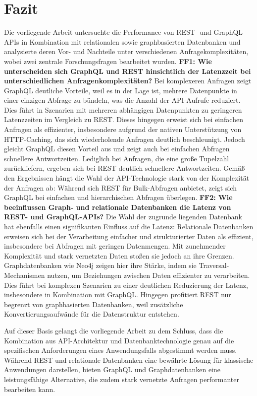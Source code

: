 \chapter{Fazit} %
\label{sec:fazit}
Die vorliegende Arbeit untersuchte die Performance von REST- und GraphQL-APIs in Kombination mit relationalen sowie graphbasierten Datenbanken und analysierte deren Vor- und Nachteile unter verschiedenen Anfragekomplexitäten, wobei zwei zentrale Forschungsfragen bearbeitet wurden.
\newline
\noindent
\textbf{FF1: Wie unterscheiden sich GraphQL und REST hinsichtlich der Latenzzeit bei unterschiedlichen Anfragenkomplexitäten?}
Bei komplexeren Anfragen zeigt GraphQL deutliche Vorteile, weil es in der Lage ist, mehrere Datenpunkte in einer einzigen Abfrage zu bündeln, was die Anzahl der API-Aufrufe reduziert. Dies führt in Szenarien mit mehreren abhängigen Datenpunkten zu geringeren Latenzzeiten im Vergleich zu REST. Dieses hingegen erweist sich bei einfachen Anfragen als effizienter, insbesondere aufgrund der nativen Unterstützung von HTTP-Caching, das sich wiederholende Anfragen deutlich beschleunigt. Jedoch gleicht GraphQL diesen Vorteil aus und zeigt auch bei einfachen Abfragen schnellere Antwortzeiten. Lediglich bei Anfragen, die eine große Tupelzahl zurückliefern, ergeben sich bei REST deutlich schnellere Antwortzeiten. Gemäß den Ergebnissen hängt die Wahl der API-Technologie stark von der Komplexität der Anfragen ab: Während sich REST für Bulk-Abfragen anbietet, zeigt sich GraphQL bei einfachen und hierarchischen Abfragen überlegen. 
\newline
\noindent
\textbf{FF2: Wie beeinflussen Graph- und relationale Datenbanken die Latenz von REST- und GraphQL-APIs?}
Die Wahl der zugrunde liegenden Datenbank hat ebenfalls einen signifikanten Einfluss auf die Latenz: Relationale Datenbanken erweisen sich bei der Verarbeitung einfacher und strukturierter Daten als effizient, insbesondere bei Abfragen mit geringen Datenmengen. Mit zunehmender Komplexität und stark vernetzten Daten stoßen sie jedoch an ihre Grenzen. Graphdatenbanken wie Neo4j zeigen hier ihre Stärke, indem sie Traversal-Mechanismen nutzen, um Beziehungen zwischen Daten effizienter zu verarbeiten. Dies führt bei komplexen Szenarien zu einer deutlichen Reduzierung der Latenz, insbesondere in Kombination mit GraphQL. Hingegen profitiert REST nur begrenzt von graphbasierten Datenbanken, weil zusätzliche Konvertierungsaufwände für die Datenstruktur entstehen.

\vspace{1em} 
\noindent
Auf dieser Basis gelangt die vorliegende Arbeit zu dem Schluss, dass die Kombination aus API-Architektur und Datenbanktechnologie genau auf die spezifischen Anforderungen eines Anwendungsfalls abgestimmt werden muss. Während REST und relationale Datenbanken eine bewährte Lösung für klassische Anwendungen darstellen, bieten GraphQL und Graphdatenbanken eine leistungsfähige Alternative, die zudem stark vernetzte Anfragen performanter bearbeiten kann.




